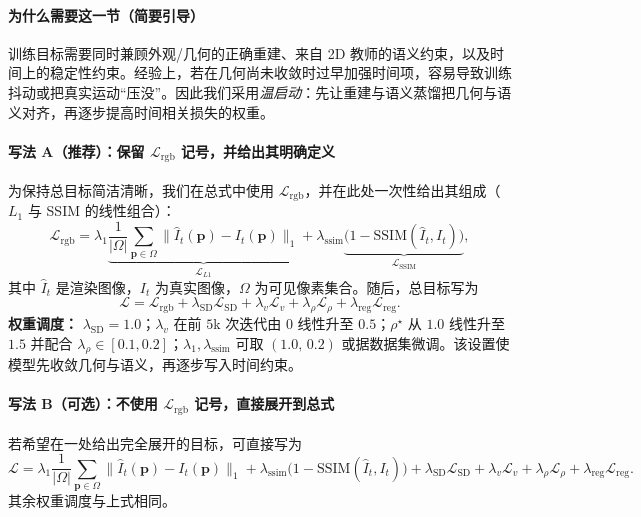 \documentclass[10pt,conference]{IEEEtran} %
\begin{document}
\paragraph{为什么需要这一节（简要引导）}
训练目标需要同时兼顾外观/几何的正确重建、来自 2D 教师的语义约束，以及时间上的稳定性约束。经验上，若在几何尚未收敛时过早加强时间项，容易导致训练抖动或把真实运动“压没”。因此我们采用\emph{温启动}：先让重建与语义蒸馏把几何与语义对齐，再逐步提高时间相关损失的权重。

\paragraph{写法 A（推荐）：保留 $\mathcal L_{\mathrm{rgb}}$ 记号，并给出其明确定义}
为保持总目标简洁清晰，我们在总式中使用 $\mathcal L_{\mathrm{rgb}}$，并在此处一次性给出其组成（$L_1$ 与 SSIM 的线性组合）：
\begin{equation}
\mathcal L_{\mathrm{rgb}}
=\lambda_{1}\underbrace{\frac{1}{|\Omega|}\sum_{\mathbf p\in\Omega}\big\|\hat I_t(\mathbf p)-I_t(\mathbf p)\big\|_1}_{\mathcal L_{L1}}
+\lambda_{\mathrm{ssim}}\underbrace{\Big(1-\mathrm{SSIM}(\hat I_t,I_t)\Big)}_{\mathcal L_{\mathrm{SSIM}}},
\label{eq:opt_lrgb_def}
\end{equation}
其中 $\hat I_t$ 是渲染图像，$I_t$ 为真实图像，$\Omega$ 为可见像素集合。随后，总目标写为
\begin{equation}
\mathcal L=\mathcal L_{\mathrm{rgb}}+\lambda_{\mathrm{SD}}\mathcal L_{\mathrm{SD}}
+\lambda_v \mathcal L_v+\lambda_\rho \mathcal L_\rho+\lambda_{\mathrm{reg}}\mathcal L_{\mathrm{reg}}.
\label{eq:opt_total}
\end{equation}
\textbf{权重调度：} $\lambda_{\mathrm{SD}}{=}1.0$；$\lambda_v$ 在前 $5$k 次迭代由 $0$ 线性升至 $0.5$；$\rho^\star$ 从 $1.0$ 线性升至 $1.5$ 并配合 $\lambda_\rho\in[0.1,0.2]$；$\lambda_{1},\lambda_{\mathrm{ssim}}$ 可取 $(1.0,\,0.2)$ 或据数据集微调。该设置使模型先收敛几何与语义，再逐步写入时间约束。

\paragraph{写法 B（可选）：不使用 $\mathcal L_{\mathrm{rgb}}$ 记号，直接展开到总式}
若希望在一处给出完全展开的目标，可直接写为
\begin{equation}
\mathcal L
=\lambda_{1}\frac{1}{|\Omega|}\sum_{\mathbf p\in\Omega}\big\|\hat I_t(\mathbf p)-I_t(\mathbf p)\big\|_1
+\lambda_{\mathrm{ssim}}\Big(1-\mathrm{SSIM}(\hat I_t,I_t)\Big)
+\lambda_{\mathrm{SD}}\mathcal L_{\mathrm{SD}}
+\lambda_v \mathcal L_v+\lambda_\rho \mathcal L_\rho+\lambda_{\mathrm{reg}}\mathcal L_{\mathrm{reg}}.
\label{eq:opt_total_expanded}
\end{equation}
其余权重调度与上式相同。
\end{document}
